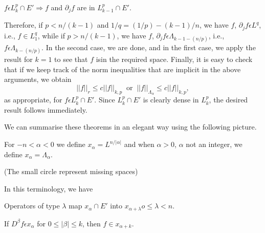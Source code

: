 $f \epsilon L^p_k \cap E'\Rightarrow f$  and  $ \partial_j f$  are
in $ L^p_{k-1} \cap E'$. 

Therefore, if $ p < n / (k-1)$  and  $1/q = (1/p) - (k-1) / n $, we
have $f$, $\partial_j f \epsilon L^q$, i.e., $f \in L^q _1$,  while
if  $p > n / (k-1)$, we have $f$, $ \partial_j f \epsilon  \Lambda
_{k-1-(n/p)}$, i.e., $f \epsilon  \Lambda_{k-(n/p)}$. In the second
case, we are done, and in the first case, we apply the result for
$k=1$ to see that $f$ is\pageoriginale in the required space. Finally, it is easy to
check that if we keep track of the norm inequalities that are implicit
in the above arguments, we obtain 
$$
 ||  f  ||_r \le c  ||  f  ||_{k,p} ~\text{ or }~  ||  f   ||_{
   \Lambda_\alpha} \le c  ||  f  ||_{k,p}, 
$$ 
as appropriate, for $ f \epsilon L^p_k \cap E'$.  Since $L^p _k \cap
E'$ is clearly dense in $L^p_k$, the desired result follows
immediately. 

We can summarise these theorems in an elegant way using the following
picture. 

For $ - n < \alpha < 0$ we define $x_\alpha = L^{n/ | \alpha |}$ and
when $\alpha > 0$, $\alpha$ not an integer, we define $x_\alpha =
\Lambda_\alpha$.  

\begin{figure}[H]
\end{figure}
(The small circle represent missing spaces)

In this terminology, we have

\setcounter{thm}{31}
\begin{thm}\label{chap5:thm5.32}%
  Operators of type $\lambda$  map  $ x_\alpha \cap E'$  into  $
  x_{\alpha+\lambda} o \le \lambda < n$. 
\end{thm}

\begin{thm} \label{chap5:thm5.33}%
  If $D^\beta f \epsilon x_\alpha $
  for  $ 0 \le  | \beta  | \le k$,  then  $f \in x_{\alpha + k}$. 
\end{thm}

